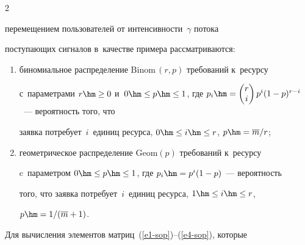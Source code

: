 \begin{multicols}{2}
\begin{figure}
\begin{minipage}[t]{80mm}
\begin{center}
{\epsfxsize=77.795mm


}

\end{center}

\vspace*{-9pt}


\end{minipage}

\end{figure}



\pagebreak



\noindent

перемещением пользователей от интенсивности~$\gamma$ потока 

поступающих сигналов в~качестве примера рассматриваются: 

  \begin{enumerate}[(1)]

\item биномиальное распределение $\mathrm{Binom}\,(r,p)$ требований к~ресурсу 

с~параметрами $r\hm\geq0$ и~$0\hm\leq p\hm\leq 1$, где $p_i\hm= 

\begin{pmatrix} r\\ i\end{pmatrix} p^i(1-p)^{r-i}$~--- вероятность того, что 

заявка потребует~$i$~единиц ресурса, $0\hm\leq i\hm\leq r$, $p\hm= 

\overline{m}/r$; 

\item геометрическое распределение $\mathrm{Geom}(p)$ требований к~ресурсу 

c~параметром $0\hm\leq p\hm\leq 1$, где $p_i\hm= p^i(1-p)$~--- вероятность 

того, что заявка потребует~$i$~единиц ресурса, $1\hm\leq i\hm\leq r$, 

$p\hm=1/(\overline{m}+1)$.

\end{enumerate}

  

  Для вычисления элементов матриц~(\ref{e1-sop})--(\ref{e4-sop}), которые 


\end{multicols}
